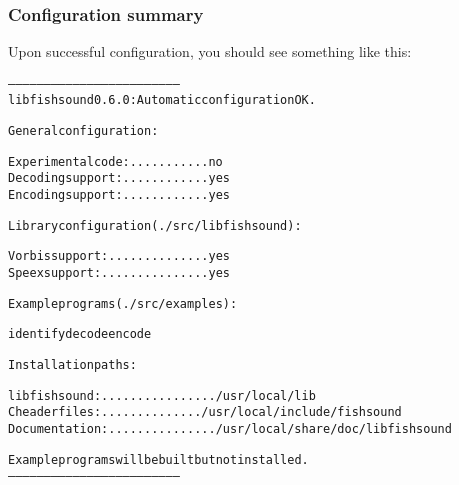\subsubsection{Configuration summary}\label{group__configuration_summary}
Upon successful configuration, you should see something like this: \small\begin{alltt}
------------------------------------------------------------------------
  libfishsound 0.6.0:  Automatic configuration OK.\end{alltt}\normalsize 


\small\begin{alltt}  General configuration:\end{alltt}\normalsize 


\small\begin{alltt}    Experimental code: ........... no
    Decoding support: ............ yes
    Encoding support: ............ yes\end{alltt}\normalsize 


\small\begin{alltt}  Library configuration (./src/libfishsound):\end{alltt}\normalsize 


\small\begin{alltt}    Vorbis support: .............. yes
    Speex support: ............... yes\end{alltt}\normalsize 


\small\begin{alltt}  Example programs (./src/examples):\end{alltt}\normalsize 


\small\begin{alltt}    identify decode encode\end{alltt}\normalsize 


\small\begin{alltt}  Installation paths:\end{alltt}\normalsize 


\small\begin{alltt}    libfishsound: ................ /usr/local/lib
    C header files: .............. /usr/local/include/fishsound
    Documentation: ............... /usr/local/share/doc/libfishsound\end{alltt}\normalsize 


\small\begin{alltt}  Example programs will be built but not installed.
------------------------------------------------------------------------
\end{alltt}\normalsize 
 